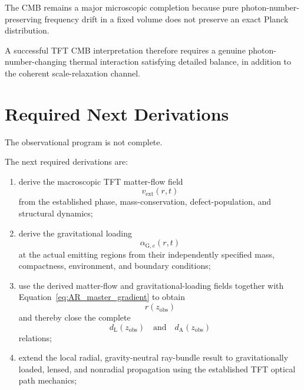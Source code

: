 The CMB remains a major microscopic completion because pure
photon-number-preserving frequency drift in a fixed volume does not preserve
an exact Planck distribution.

A successful TFT CMB interpretation therefore requires a genuine
photon-number-changing thermal interaction satisfying detailed balance, in
addition to the coherent scale-relaxation channel.


\section{Required Next Derivations}

The observational program is not complete.

The next required derivations are:

\begin{enumerate}
    \item derive the macroscopic TFT matter-flow field
    \begin{equation}
        v_{\mathrm{ext}}(r,t)
    \end{equation}
    from the established phase, mass-conservation, defect-population, and
    structural dynamics;

    \item derive the gravitational loading
    \begin{equation}
        \alpha_{\mathrm G,e}(r,t)
    \end{equation}
    at the actual emitting regions from their independently specified mass,
    compactness, environment, and boundary conditions;

    \item use the derived matter-flow and gravitational-loading fields together
    with Equation~\eqref{eq:AR_master_gradient} to obtain
    \begin{equation}
        r(z_{\mathrm{obs}})
    \end{equation}
    and thereby close the complete
    \begin{equation}
        d_{\mathrm L}(z_{\mathrm{obs}})
        \quad\text{and}\quad
        d_{\mathrm A}(z_{\mathrm{obs}})
    \end{equation}
    relations;

    \item extend the local radial, gravity-neutral ray-bundle result to
    gravitationally loaded, lensed, and nonradial propagation using the
    established TFT optical path mechanics;


\end{enumerate}
